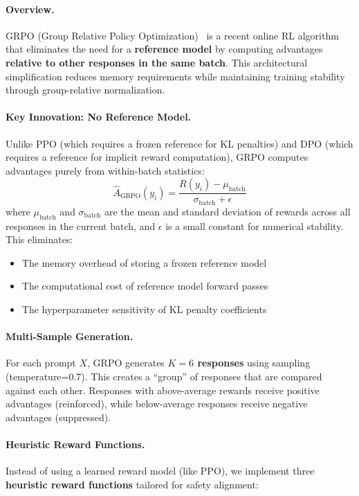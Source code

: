 \paragraph{Overview.} GRPO (Group Relative Policy Optimization)~\cite{shao2024deepseekmath} is a recent online RL algorithm that eliminates the need for a \textbf{reference model} by computing advantages \textbf{relative to other responses in the same batch}. This architectural simplification reduces memory requirements while maintaining training stability through group-relative normalization.

\paragraph{Key Innovation: No Reference Model.} Unlike PPO (which requires a frozen reference for KL penalties) and DPO (which requires a reference for implicit reward computation), GRPO computes advantages purely from within-batch statistics:
\begin{equation}
    \hat{A}_{\text{GRPO}}(y_i) = \frac{R(y_i) - \mu_{\text{batch}}}{\sigma_{\text{batch}} + \epsilon}
\end{equation}
where $\mu_{\text{batch}}$ and $\sigma_{\text{batch}}$ are the mean and standard deviation of rewards across all responses in the current batch, and $\epsilon$ is a small constant for numerical stability. This eliminates:
\begin{itemize}[leftmargin=*]
    \item The memory overhead of storing a frozen reference model
    \item The computational cost of reference model forward passes
    \item The hyperparameter sensitivity of KL penalty coefficients
\end{itemize}

\paragraph{Multi-Sample Generation.} For each prompt $X$, GRPO generates \textbf{$K=6$ responses} using sampling (temperature=0.7). This creates a ``group'' of responses that are compared against each other. Responses with above-average rewards receive positive advantages (reinforced), while below-average responses receive negative advantages (suppressed).

\paragraph{Heuristic Reward Functions.} Instead of using a learned reward model (like PPO), we implement three \textbf{heuristic reward functions} tailored for safety alignment:

